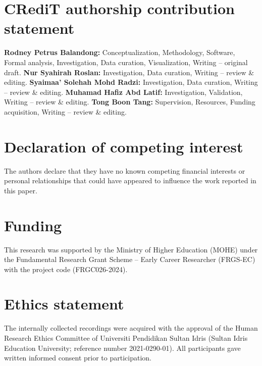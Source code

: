 \documentclass[preprint,review,12pt,number,sort&compress]{elsarticle}
\begin{document}
\linenumbers


%
%






\section*{CRediT authorship contribution statement}
\textbf{Rodney Petrus Balandong:} Conceptualization, Methodology, Software,
Formal analysis, Investigation, Data curation, Visualization,
Writing -- original draft.
\textbf{Nur Syahirah Roslan:} Investigation, Data curation,
Writing -- review \& editing.
\textbf{Syaimaa' Solehah Mohd Radzi:} Investigation, Data curation,
Writing -- review \& editing.
\textbf{Muhamad Hafiz Abd Latif:} Investigation, Validation,
Writing -- review \& editing.
\textbf{Tong Boon Tang:} Supervision, Resources, Funding acquisition,
Writing -- review \& editing.

\section*{Declaration of competing interest}

The authors declare that they have no known competing financial interests or
personal relationships that could have appeared to influence the work reported
in this paper.

\section*{Funding}
This research was supported by the Ministry of Higher Education (MOHE) under the Fundamental Research Grant Scheme -- Early Career Researcher (FRGS-EC) with the project code (FRGC026-2024).

\section*{Ethics statement}
The internally collected recordings were acquired with the approval of
the Human Research Ethics Committee of Universiti Pendidikan Sultan Idris (Sultan Idris Education University; reference number 2021-0290-01). All participants gave written informed
consent prior to participation.
\end{document}
